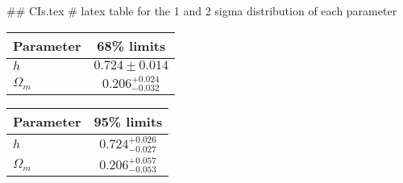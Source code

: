 ## CIs.tex
# latex table for the 1 and 2 sigma distribution of each parameter

\begin{tabular} { l  c}
 Parameter &  68\% limits\\
\hline
{\boldmath$h              $} & $0.724\pm 0.014            $\\
{\boldmath$\Omega_m       $} & $0.206^{+0.024}_{-0.032}   $\\
\hline
\end{tabular}

\begin{tabular} { l  c}
 Parameter &  95\% limits\\
\hline
{\boldmath$h              $} & $0.724^{+0.026}_{-0.027}   $\\
{\boldmath$\Omega_m       $} & $0.206^{+0.057}_{-0.053}   $\\
\hline
\end{tabular}
